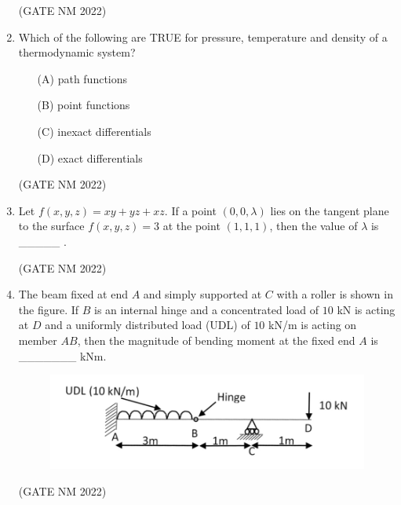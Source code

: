 \documentclass[journal,12pt,onecolumn]{IEEEtran}
\theoremstyle{remark}
\begin{document}
\begin{enumerate}
\hfill(GATE NM 2022)




\item  Which of the following are TRUE for pressure, temperature and density of a thermodynamic system?

	\begin{multicols}{2}

\begin{enumerate}
    \item[(A)] path functions
    \item[(B)] point functions
    \item[(C)] inexact differentials
    \item[(D)] exact differentials
\end{enumerate}

	\end{multicols}

\hfill(GATE NM 2022)







\item  Let $ f(x, y, z) = xy + yz + xz . $ If a point $ (0, 0, \lambda) $ lies on the tangent plane to the surface  
$
f(x, y, z) = 3
$
at the point $ (1, 1, 1) $, then the value of $ \lambda $ is \_\_\_\_\_ .

\hfill(GATE NM 2022)







\item  The beam fixed at end $A$ and simply supported at $C$ with a roller is shown in the figure.  
If $B$  is an internal hinge and a concentrated load of $10$ kN is acting at $D$ and a uniformly distributed load (UDL) of $10$ kN/m  is acting on member $AB$, then the magnitude of bending moment at the fixed end $A$ is \_\_\_\_\_\_\_ kNm.

\begin{figure}[h]
	\centering
    \includegraphics[width=0.6\columnwidth]{fig4}
	\caption{}
	\label{fig:placeholder}
\end{figure}

\hfill(GATE NM 2022)








\end{enumerate}
\end{document}
